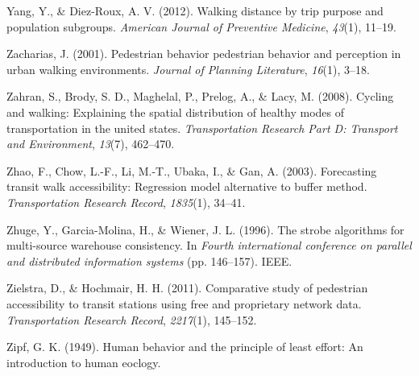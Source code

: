 \documentclass[
11pt, %
oneside, %
english, %
singlespacing, %
]{macthesis} %
\newlength{\cslhangindent}
\newenvironment{CSLReferences}[2] %
 {%
  \setlength{\parindent}{0pt}
  \ifodd #1 \everypar{\setlength{\hangindent}{\cslhangindent}}\ignorespaces\fi
  \ifnum #2 > 0
  \setlength{\parskip}{#2\baselineskip}
  \fi
 }%
 {}
\begin{document}
\begin{CSLReferences}{1}{0}
Yang, Y., \& Diez-Roux, A. V. (2012). Walking distance by trip purpose and population subgroups. \emph{American Journal of Preventive Medicine}, \emph{43}(1), 11--19.

Zacharias, J. (2001). Pedestrian behavior pedestrian behavior and perception in urban walking environments. \emph{Journal of Planning Literature}, \emph{16}(1), 3--18.

Zahran, S., Brody, S. D., Maghelal, P., Prelog, A., \& Lacy, M. (2008). Cycling and walking: Explaining the spatial distribution of healthy modes of transportation in the united states. \emph{Transportation Research Part D: Transport and Environment}, \emph{13}(7), 462--470.

Zhao, F., Chow, L.-F., Li, M.-T., Ubaka, I., \& Gan, A. (2003). Forecasting transit walk accessibility: Regression model alternative to buffer method. \emph{Transportation Research Record}, \emph{1835}(1), 34--41.

Zhuge, Y., Garcia-Molina, H., \& Wiener, J. L. (1996). The strobe algorithms for multi-source warehouse consistency. In \emph{Fourth international conference on parallel and distributed information systems} (pp. 146--157). IEEE.

Zielstra, D., \& Hochmair, H. H. (2011). Comparative study of pedestrian accessibility to transit stations using free and proprietary network data. \emph{Transportation Research Record}, \emph{2217}(1), 145--152.

Zipf, G. K. (1949). Human behavior and the principle of least effort: An introduction to human eoclogy.

\end{CSLReferences}
\end{document}
